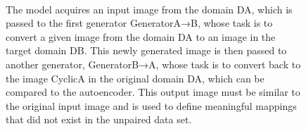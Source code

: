   \begin{figure}
  \centering
{}
\caption{The model acquires an input image from the domain DA, 
which is passed to the first generator GeneratorA→B, 
whose task is to convert a given image from the 
domain DA to an image in the target domain DB. 
This newly generated image is then passed to another generator, 
GeneratorB→A, whose task is to convert back to 
the image CyclicA in the original domain DA,
which can be compared to the autoencoder. 
This output image must be similar to the 
original input image and is used to define 
meaningful mappings that did not exist in the unpaired data set.} 
\label{fig:1}
\end{figure}

    